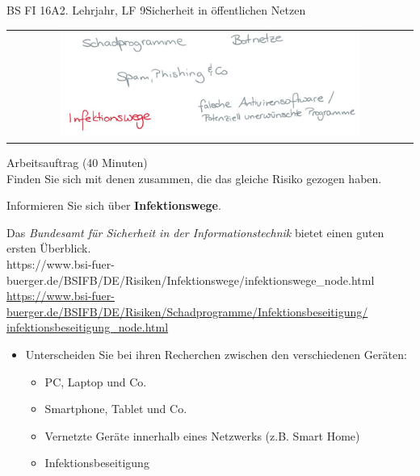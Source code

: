 \documentclass[oneside,openany,headings=optiontotoc,11pt,numbers=noenddot]{scrreprt}
\begin{document}
\begin{worksheet}{BS FI 16A}{2. Lehrjahr, LF 9}{Sicherheit in öffentlichen Netzen}
		\newpage
		\setcounter{page}{1}
		\begin{framed}
			\begin{tabular}{lcr}
				& \includegraphics[width=0.8\textwidth]{Bilder/Infektionswege.jpg} & \\
			\end{tabular}
		\end{framed}
		\color{codegray}Arbeitsauftrag (40 Minuten)\\
		\color{black}
		Finden Sie sich mit denen zusammen, die das gleiche Risiko gezogen haben.
		\par
		\bigskip
		\noindent
		Informieren Sie sich über \textbf{Infektionswege}.
		\par
		\bigskip
		\noindent
		Das \textit{Bundesamt für Sicherheit in der Informationstechnik} bietet einen guten ersten Überblick.\\
		\small{\color{codegray}https://www.bsi-fuer-buerger.de/BSIFB/DE/Risiken/Infektionswege/infektionswege\_node.html}\\
		\small{\color{codegray}\href{https://www.bsi-fuer-buerger.de/BSIFB/DE/Risiken/Schadprogramme/Infektionsbeseitigung/infektionsbeseitigung\_node.html}{https://www.bsi-fuer-buerger.de/BSIFB/DE/Risiken/Schadprogramme/Infektionsbeseitigung/\\infektionsbeseitigung\_node.html}}
		\normalsize
		\begin{itemize}
			\item[] Unterscheiden Sie bei ihren Recherchen zwischen den verschiedenen Geräten:
			\begin{itemize}
				\item PC, Laptop und Co.
				\item Smartphone, Tablet und Co.
				\item Vernetzte Geräte innerhalb eines Netzwerks (z.B. Smart Home)
				\item Infektionsbeseitigung
			\end{itemize}
		\end{itemize}
		\par
		\bigskip
		\noindent
		

\end{worksheet}
\end{document}
